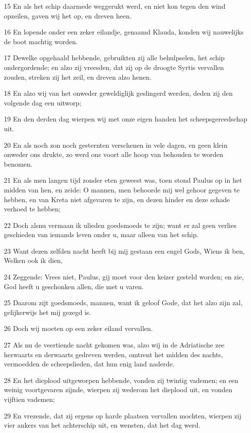 \par 15 En als het schip daarmede weggerukt werd, en niet kon tegen den wind opzeilen, gaven wij het op, en dreven heen.
\par 16 En lopende onder een zeker eilandje, genaamd Klauda, konden wij nauwelijks de boot machtig worden.
\par 17 Dewelke opgehaald hebbende, gebruikten zij alle behulpselen, het schip ondergordende; en alzo zij vreesden, dat zij op de droogte Syrtis vervallen zouden, streken zij het zeil, en dreven alzo henen.
\par 18 En alzo wij van het onweder geweldiglijk geslingerd werden, deden zij den volgende dag een uitworp;
\par 19 En den derden dag wierpen wij met onze eigen handen het scheepsgereedschap uit.
\par 20 En als noch zon noch gesternten verschenen in vele dagen, en geen klein onweder ons drukte, zo werd ons voort alle hoop van behouden te worden benomen.
\par 21 En als men langen tijd zonder eten geweest was, toen stond Paulus op in het midden van hen, en zeide: O mannen, men behoorde mij wel gehoor gegeven te hebben, en van Kreta niet afgevaren te zijn, en dezen hinder en deze schade verhoed te hebben;
\par 22 Doch alsnu vermaan ik ulieden goedsmoeds te zijn; want er zal geen verlies geschieden van iemands leven onder u, maar alleen van het schip.
\par 23 Want dezen zelfden nacht heeft bij mij gestaan een engel Gods, Wiens ik ben, Welken ook ik dien,
\par 24 Zeggende: Vrees niet, Paulus, gij moet voor den keizer gesteld worden; en zie, God heeft u geschonken allen, die met u varen.
\par 25 Daarom zijt goedsmoeds, mannen, want ik geloof Gode, dat het alzo zijn zal, gelijkerwijs het mij gezegd is.
\par 26 Doch wij moeten op een zeker eiland vervallen.
\par 27 Als nu de veertiende nacht gekomen was, alzo wij in de Adriatische zee herwaarts en derwaarts gedreven werden, omtrent het midden des nachts, vermoedden de scheepslieden, dat hun enig land naderde.
\par 28 En het dieplood uitgeworpen hebbende, vonden zij twintig vademen; en een weinig voortgevaren zijnde, wierpen zij wederom het dieplood uit, en vonden vijftien vademen;
\par 29 En vrezende, dat zij ergens op harde plaatsen vervallen mochten, wierpen zij vier ankers van het achterschip uit, en wensten, dat het dag werd.
